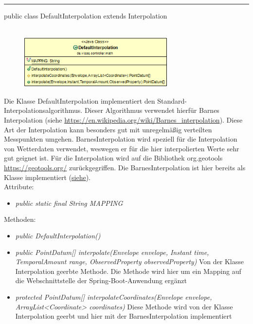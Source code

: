 \rule{\textwidth}{0.4pt}
public class DefaultInterpolation extends Interpolation
\\\\
    \begin{figure}[H]
        {\centering\includegraphics[width=0.7\textwidth]{media/backend/controller/classes/DefaultInterpolation.png}}
    \end{figure}
    Die Klasse DefaultInterpolation implementiert den Standard-Interpolationsalgorithmus.
    Dieser Algorithmus verwendet hierfür Barnes Interpolation (siehe \url{https://en.wikipedia.org/wiki/Barnes_interpolation}).
    Diese Art der Interpolation kann besonders gut mit unregelmäßig verteilten Messpunkten umgehen.
    BarnesInterpolation wird speziell für die Interpolation von Wetterdaten verwendet, weswegen er für die hier interpolierten Werte sehr gut geignet ist.
    Für die Interpolation wird auf die Bibliothek org.geotools \url{https://geotools.org/} zurückgegriffen.
    Die BarnesInterpolation ist hier bereits als Klasse implementiert (\href{http://docs.geotools.org/latest/javadocs/org/geotools/process/vector/BarnesSurfaceInterpolator.html}{siehe}).
\\
Attribute:
\begin{itemize}
    \item \emph{public static final String MAPPING} \mappingDescription
\end{itemize}
Methoden:
\begin{itemize}
    \item \emph{public DefaultInterpolation()}
    \item \emph{public PointDatum[] interpolate(Envelope envelope, Instant time, TemporalAmount range, ObservedProperty observedProperty)}
    Von der Klasse Interpolation geerbte Methode. Die Methode wird hier um ein Mapping auf die Webschnittstelle der Spring-Boot-Anwendung ergänzt
   \item \emph{protected PointDatum[] interpolateCoordinates(Envelope envelope, ArrayList<Coordinate> coordinates)}
    Diese Methode wird von der Klasse Interpolation geerbt und hier mit der BarnesInterpolation implementiert
\end{itemize}
